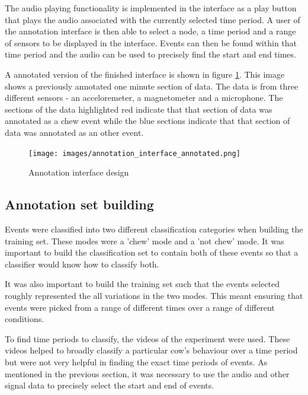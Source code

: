 The audio playing functionality is implemented in the interface as a play button that plays the audio associated with the currently selected time period. A user of the annotation interface is then able to select a node, a time period and a range of sensors to be displayed in the interface. Events can then be found within that time period and the audio can be used to precisely find the start and end times. 

A annotated version of the finished interface is shown in figure \ref{annotationinterface}. This image shows a previously annotated one minute section of data. The data is from three different sensors - an acceloremeter, a magnetometer and a microphone. The sections of the data highlighted red indicate that that section of data was annotated as a chew event while the blue sections indicate that that section of data was annotated as an other event. 

\begin{figure}[ht!]
\begin{center}
\leavevmode
\texttt{[image: images/annotation\_interface\_annotated.png]}
\end{center}
\caption{Annotation interface design}
\label{annotationinterface}
\end{figure}

\subsection{Annotation set building}

Events were classified into two different classification categories when building the training set. These modes were a 'chew' mode and a 'not chew' mode. It was important to build the classification set to contain both of these events so that a classifier would know how to classify both. 

It was also important to build the training set such that the events selected roughly represented the all variations in the two modes. This meant ensuring that events were picked from a range of different times over a range of different conditions.

To find time periods to classify, the videos of the experiment were used. These videos helped to broadly classify a particular cow's behaviour over a time period but were not very helpful in finding the exact time periods of events. As mentioned in the previous section, it was necessary to use the audio and other signal data to precisely select the start and end of events. 


